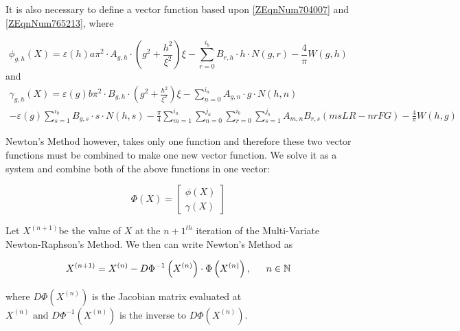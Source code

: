 \documentclass{article}
\newcommand{\spbox}[1]{ \text{ #1 }} %
\begin{document}
It is also necessary to define a vector function based upon
\eqref{ZEqnNum704007} and \eqref{ZEqnNum765213}, where

\begin{equation} \label{4.2)} 
    \phi _{g,h} \left(X\right) = \varepsilon \left(h \right) a \pi ^{2} 
    \cdot A_{g,h} \cdot \left(g^{2} + \frac{h^{2} }{\xi ^{2}} \right)
    \xi - \sum _{r=0}^{i_{b} }B_{r,h} \cdot h \cdot N\left(g,r\right)
    - \frac{4}{\pi } W\left(g,h\right) 
\end{equation} 
and
\begin{equation} \label{4.3)} \begin{array}{l} 
    \gamma _{g,h} \left(X\right) = \varepsilon \left(g \right) b \pi ^{2} 
    \cdot B_{g,h} \cdot \left(g^{2} + \frac{h^{2}}{\xi ^{2}} \right) \xi 
    - \sum _{n=0}^{i_{a} }A_{g,n} \cdot g \cdot N\left(h,n\right) \\ 
    - \varepsilon \left(g\right) \sum_{s=1}^{i_{b}} 
    B_{g,s} \cdot s \cdot N\left(h,s\right) - \frac{\pi}{4} 
    \sum_{m=1}^{i_{a}} \sum _{n=0}^{j_{a} } \sum _{r=0}^{i_{b}} \sum _{s=1}^{j_{b}} 
    A_{m,n} B_{r,s} \left(msLR - nrFG\right) - \frac{4}{\pi} W\left(h,g\right)
\end{array} \end{equation}

Newton's Method however, takes only one function and therefore these two vector
functions must be combined to make one new vector function. We solve it as a
system and combine both of the above functions in one vector:

\begin{equation} \label{ZEqnNum407215} \Phi
\left(X\right)=\left[\begin{array}{c} {\phi \left(X\right)} \\ {\gamma
\left(X\right)} \end{array} \right] \end{equation}

Let $X^{(n+1)} $be the value of $X$ at the $n+1^{th} $ iteration of the
Multi-Variate Newton-Raphson's Method. We then can write Newton's Method as

\begin{equation} \label{4.5)} X^{\left(n+1\right)} =X^{\left(n\right)} -D\Phi
^{-1} \left(X^{\left(n\right)} \right)\cdot \Phi \left(X^{\left(n\right)}
\right), \text{ \; \; } n\in {\mathbb N} \end{equation}

where $D\Phi \left(X^{\left(n\right)} \right)$ is the Jacobian matrix evaluated
at $X^{\left(n\right)} \spbox{and} D\Phi ^{-1} \left(X^{\left(n\right)} \right)$ is
the inverse to $D\Phi \left(X^{\left(n\right)} \right)$.
\end{document}
